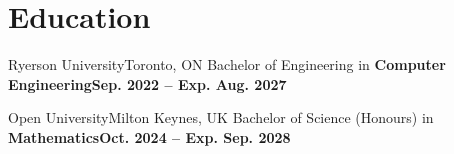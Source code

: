 

\section{Education}
  \resumeSubHeadingListStart
    \resumeSubheading
      {Ryerson University}{Toronto, ON}
      {Bachelor of Engineering in \textbf{Computer Engineering}}{\textbf{Sep. 2022 -- Exp. Aug. 2027}}
      
      \vspace{0.05cm}
      
      
    
    \vspace{-0.1cm}
    
    \resumeSubheading
      {Open University}{Milton Keynes, UK}
      {Bachelor of Science (Honours) in \textbf{Mathematics}}{\textbf{Oct. 2024 -- Exp. Sep. 2028}}
      
      \vspace{0.05cm}
      
      
      

    \spaceReducerMini
    
  \resumeSubHeadingListEnd

